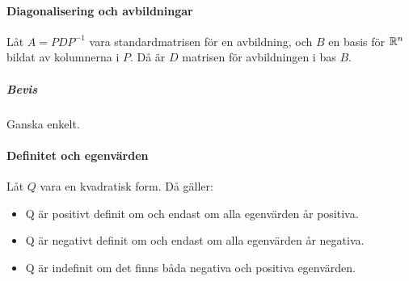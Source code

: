 \paragraph{Diagonalisering och avbildningar}
Låt $A = PDP^{-1}$ vara standardmatrisen för en avbildning, och $B$ en basis för $\mathbb{R}^n$ bildat av kolumnerna i $P$. Då är $D$ matrisen för avbildningen i bas $B$.

\subparagraph{Bevis}
Ganska enkelt.

\paragraph{Definitet och egenvärden}
Låt $Q$ vara en kvadratisk form. Då gäller:
\begin{itemize}
	\item Q är positivt definit om och endast om alla egenvärden år positiva.
	\item Q är negativt definit om och endast om alla egenvärden år negativa.
	\item Q är indefinit om det finns båda negativa och positiva egenvärden.
\end{itemize}